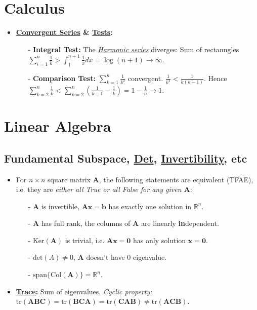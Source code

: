 \documentclass[9pt, landscape]{article}
\begin{document}
\begin{multicols*}{3}
\section{Calculus}
\begin{itemize}
	\item \textbf{\href{https://en.wikipedia.org/wiki/Convergent_series}{Convergent Series} \& \href{https://en.wikipedia.org/wiki/Convergence_tests}{Tests}:} 
	\begin{itemize}[leftmargin=10pt,noitemsep,topsep=0pt,partopsep=0pt]
		\item[-] \textbf{Integral Test:} The \href{https://en.wikipedia.org/wiki/Harmonic_series_(mathematics)}{\textit{Harmonic series}} diverges: Sum of rectanngles $\sum_{i=1}^n \frac{1}{k} > \int_1^{n+1} \frac{1}{x} dx = \log (n+1) \to \infty$. 
		\item[-] \textbf{Comparison Test:} $\sum_{k=1}^{n} \frac{1}{k^2}$ convergent. $\frac{1}{k^2} < \frac{1}{k(k-1)}$. Hence $\sum_{k=2}^n \frac{1}{k} < \sum_{k=2}^n (\frac{1}{k-1} - \frac{1}{k}) = 1-\frac{1}{n} \to 1$.
	\end{itemize}
\end{itemize}

\section{Linear Algebra}
\subsection{Fundamental Subspace, \href{https://en.wikipedia.org/wiki/Determinant}{Det}, \href{https://en.wikipedia.org/wiki/Invertible_matrix}{Invertibility}, etc}
\begin{itemize}
	\item For $n\times n$ square matrix $\bm{A}$, the following statements are equivalent (TFAE), i.e. they are \textit{either all True or all False for any given $\bm{A}$}:
	\begin{itemize}[leftmargin=10pt,noitemsep,topsep=0pt,partopsep=0pt]
		\item[-] $\bm{A}$ is invertible, $\bm{Ax} = \bm{b}$ has exactly one solution in $\mathbb{R}^n$.
		\item[-] $\bm{A}$ has full rank, the columns of $\bm{A}$ are linearly \textbf{in}dependent.
		\item[-] $\text{Ker}(\bm{A})$ is trivial, i.e. $\bm{Ax} = \bm{0}$ has only solution $\bm{x}=\bm{0}$.
		\item[-] $\text{det}(A) \ne 0$, $\bm{A}$ doesn't have 0 eigenvalue.
		\item[-] $\text{span}\{\text{Col}(\bm{A})\} = \mathbb{R}^n$.
	\end{itemize}
	\item \textbf{\href{https://en.wikipedia.org/wiki/Trace_(linear_algebra)}{Trace}:} Sum of eigenvalues, \textit{Cyclic property: }$\text{tr}(\bm{ABC}) = \text{tr}(\bm{BCA}) = \text{tr}(\bm{CAB}) \ne \text{tr}(\bm{ACB})$.
\end{itemize}

\end{multicols*}
\end{document}
